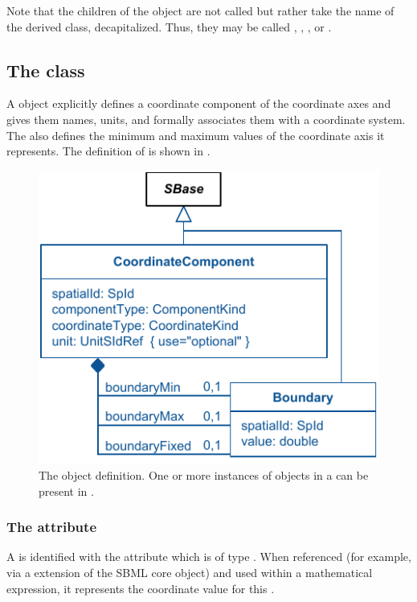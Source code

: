 Note that the children of the \ListOfGeometryDefinitions object are not called  but rather take the name of the derived class, decapitalized.  Thus, they may be called , , , or .


\subsection{The  class}
\label{CoordinateComponent-class}
A \CoordinateComponent object explicitly defines a coordinate component of the coordinate axes and gives them names, units, and formally associates them with a coordinate system. The \CoordinateComponent also defines the minimum and maximum values of the coordinate axis it represents. The definition of \CoordinateComponent is shown in .
 
\begin{figure}[ht]
  \includegraphics{figs/CoordinateComponent-uml}
  \caption{The \CoordinateComponent object definition. One or more instances of \CoordinateComponent objects in a \ListOfCoordinateComponents can be present in \Geometry.}
  \label{CoordinateComponent-uml}
\end{figure}


\subsubsection{The  attribute}
A \CoordinateComponent is identified with the  attribute which is of type .  When referenced (for example, via a \SpatialSymbolReference extension of the SBML core \Parameter object) and used within a mathematical expression, it represents the coordinate value for this \CoordinateComponent.
 
